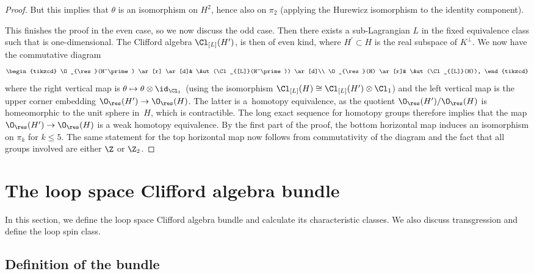 \begin{proof}
But this implies that $\theta$ is an isomorphism on $H^2$, hence also on $\pi_2$ (applying the Hurewicz isomorphism to the identity component).

This finishes the proof in the even case, so we now discuss the odd case.
Then there exists a sub-Lagrangian $L$ in the fixed equivalence class such that  is one-dimensional.
The Clifford algebra $\Cl_{[L]}(H^\prime)$, is then of even kind, where $H^\prime \subset H$ is the real subspace of $K^\perp$.
We now have the commutative diagram
\begin{equation*}
\begin{tikzcd}
 \O_{\res}(H^\prime) \ar[r] \ar[d]& \Aut(\Cl_{[L]}(H^\prime)) \ar[d]\\
 \O_{\res}(H) \ar[r]& \Aut(\Cl_{[L]}(H)),
\end{tikzcd}
\end{equation*}
where the right vertical map is $\theta \mapsto \theta \otimes \id_{\Cl_1}$ (using the isomorphism $\Cl_{[L]}(H) \cong \Cl_{[L]}(H^\prime) \otimes \Cl_1$) and the left vertical map is the upper corner embedding $\O_{\res}(H^\prime) \to \O_{\res}(H)$.
The latter is a~homotopy equivalence, as the quotient $\O_{\res}(H^\prime) / \O_{\res}(H)$ is homeomorphic to the unit sphere in~$H$, which is contractible.
The long exact sequence for homotopy groups therefore implies that the map $\O_{\res}(H^\prime) \to \O_{\res}(H)$ is a weak homotopy equivalence.
By the first part of the proof, the bottom horizontal map induces an isomorphism on $\pi_k$ for $k \leq 5$.
The same statement for the top horizontal map now follows from commutativity of the diagram and the fact that all groups involved are either $\Z$ or $\Z_2$.
\end{proof}


\section{The loop space Clifford algebra bundle}\label{sec4}

In this section, we define the loop space Clifford algebra bundle and calculate its characteristic classes.
We also discuss transgression and define the loop spin class.

\subsection{Definition of the bundle} \label{SectionLoopSpaceCliffordBundle}

